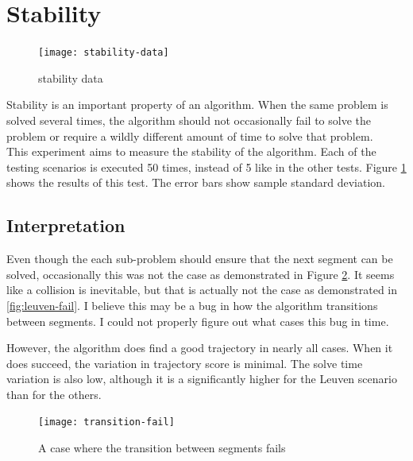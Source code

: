 \section{Stability}
\label{subsec:stability}
\begin{figure}[]
	\centering
	\texttt{[image: stability-data]}
	\caption{stability data}
	\label{fig:stability-data}
\end{figure}
Stability is an important property of an algorithm. When the same problem is solved several times, the algorithm should not occasionally fail to solve the problem or require a wildly different amount of time to solve that problem. \\
This experiment aims to measure the stability of the algorithm. Each of the testing scenarios is executed 50 times, instead of 5 like in the other tests. Figure \ref{fig:stability-data} shows the results of this test. The error bars show sample standard deviation. \\

\subsection{Interpretation}
Even though the each sub-problem should ensure that the next segment can be solved, occasionally this was not the case as demonstrated in Figure \ref{fig:transition-fail}. It seems like a collision is inevitable, but that is actually not the case as demonstrated in \ref{fig:leuven-fail}. I believe this may be a bug in how the algorithm transitions between segments. I could not properly figure out what cases this bug in time.
\par
However, the algorithm does find a good trajectory in nearly all cases. When it does succeed, the variation in trajectory score is minimal. The solve time variation is also low, although it is a significantly higher for the Leuven scenario than for the others.
\begin{figure}[]
	\centering
	\texttt{[image: transition-fail]}
	\caption{A case where the transition between segments fails}
	\label{fig:transition-fail}
\end{figure}

